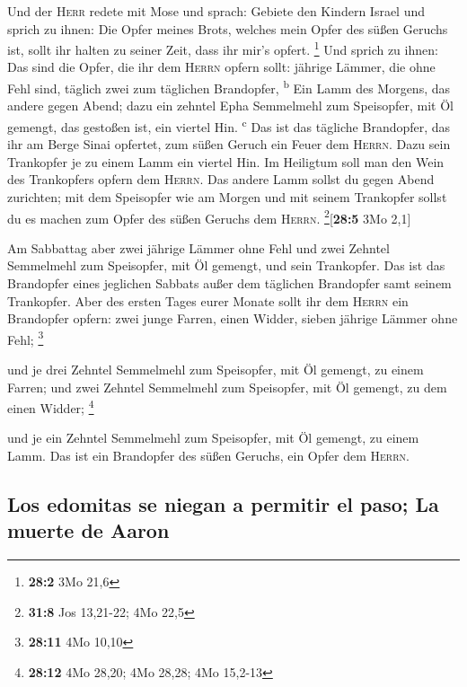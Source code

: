  Und der \textsc{Herr} redete mit Mose und sprach:
 Gebiete den Kindern Israel und sprich zu ihnen: Die Opfer
meines Brots, welches mein Opfer des süßen Geruchs ist, sollt ihr halten
zu seiner Zeit, dass ihr mir's opfert. \footnote{\textbf{28:2} 3Mo 21,6}
 Und sprich zu ihnen: Das sind die Opfer, die ihr dem
\textsc{Herrn} opfern sollt: jährige Lämmer, die ohne Fehl sind, täglich
zwei zum täglichen Brandopfer, \textsuperscript{b}  Ein
Lamm des Morgens, das andere gegen Abend;  dazu ein
zehntel Epha Semmelmehl zum Speisopfer, mit Öl gemengt, das gestoßen
ist, ein viertel Hin. \textsuperscript{c}  Das ist das
tägliche Brandopfer, das ihr am Berge Sinai opfertet, zum süßen Geruch
ein Feuer dem \textsc{Herrn}.  Dazu sein Trankopfer je zu
einem Lamm ein viertel Hin. Im Heiligtum soll man den Wein des
Trankopfers opfern dem \textsc{Herrn}.  Das andere Lamm
sollst du gegen Abend zurichten; mit dem Speisopfer wie am Morgen und
mit seinem Trankopfer sollst du es machen zum Opfer des süßen Geruchs
dem \textsc{Herrn}. \footnote{\textbf{31:8} Jos 13,21-22; 4Mo 22,5}{[}\textbf{28:5}
3Mo 2,1{]}

 Am Sabbattag aber zwei jährige Lämmer ohne Fehl und zwei
Zehntel Semmelmehl zum Speisopfer, mit Öl gemengt, und sein Trankopfer.
 Das ist das Brandopfer eines jeglichen Sabbats außer dem
täglichen Brandopfer samt seinem Trankopfer.  Aber des
ersten Tages eurer Monate sollt ihr dem \textsc{Herrn} ein Brandopfer
opfern: zwei junge Farren, einen Widder, sieben jährige Lämmer ohne
Fehl; \footnote{\textbf{28:11} 4Mo 10,10}

 und je drei Zehntel Semmelmehl zum Speisopfer, mit Öl
gemengt, zu einem Farren; und zwei Zehntel Semmelmehl zum Speisopfer,
mit Öl gemengt, zu dem einen Widder; \footnote{\textbf{28:12} 4Mo 28,20;
  4Mo 28,28; 4Mo 15,2-13}

 und je ein Zehntel Semmelmehl zum Speisopfer, mit Öl
gemengt, zu einem Lamm. Das ist ein Brandopfer des süßen Geruchs, ein
Opfer dem \textsc{Herrn}.

\hypertarget{los-edomitas-se-niegan-a-permitir-el-paso-la-muerte-de-aaron}{%
\subsection{Los edomitas se niegan a permitir el paso; La muerte de
Aaron}\label{los-edomitas-se-niegan-a-permitir-el-paso-la-muerte-de-aaron}}

